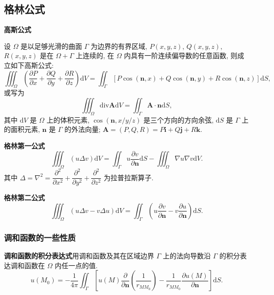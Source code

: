 \subsection{格林公式} \label{4 格林公式}
\textbf{高斯公式}

设 $\Omega$ 是以足够光滑的曲面 $\Gamma$ 为边界的有界区域, $P(x,y,z)$, $Q(x,y,z)$, $R(x,y,z)$ 是在 $\Omega+\Gamma$ 上连续的, 在 $\Omega$ 内具有一阶连续偏导数的任意函数, 则成立如下高斯公式:
\begin{equation}
    \iiint_{\Omega}\left(\frac{\partial P}{\partial x}+\frac{\partial Q}{\partial y}+\frac{\partial R}{\partial z}\right)\mathrm{d}V=\iint_{\Gamma}[P\cos(\boldsymbol{n},x)+Q\cos(\boldsymbol{n},y)+R\cos(\boldsymbol{n},z)]\mathrm{d}S,
\end{equation}
或写为
\begin{equation}
    \iiint_{\Omega}\mathrm{div}\boldsymbol{A}\mathrm{d}V=\iint_{\Gamma}\boldsymbol{A}\cdot\boldsymbol{n}\mathrm{d}S,
\end{equation}
其中 $\mathrm{d}V$ 是 $\Omega$ 上的体积元素, $\cos(\boldsymbol{n}, x/y/z)$ 是三个方向的方向余弦, $\mathrm{d}S$ 是 $\Gamma$ 上的面积元素, $\boldsymbol{n}$ 是 $\Gamma$ 的外法向量; $\boldsymbol{A}=(P,Q,R)=P\boldsymbol{i}+Q\boldsymbol{j}+R\boldsymbol{k}$.

\textbf{格林第一公式}
\begin{equation}
    \iiint_{\Omega}(u\Delta v)\mathrm{d}V=\iint_{\Gamma}u\frac{\partial v}{\partial\boldsymbol{n}}\mathrm{d}S-\iiint_{\Omega}\nabla u\nabla v\mathrm{d}V.
\end{equation}
其中 $\Delta=\nabla^2=\dfrac{\partial^2}{\partial x^2}+\dfrac{\partial^2}{\partial y^2}+\dfrac{\partial^2}{\partial z^2}$ 为拉普拉斯算子.

\textbf{格林第二公式}
\begin{equation} \label{eq:4.2 green 2}
    \iiint_{\Omega}(u\Delta v-v\Delta u)\mathrm{d}V=\iint_{\Gamma}\left(u\frac{\partial v}{\partial\boldsymbol{n}}-v\frac{\partial u}{\partial\boldsymbol{n}}\right)\mathrm{d}S.
\end{equation}

\subsubsection{调和函数的一些性质}
\textbf{调和函数的积分表达式}\quad 用调和函数及其在区域边界 $\Gamma$ 上的法向导数沿 $\Gamma$ 的积分表达调和函数在 $\Omega$ 内任一点的值.
\begin{equation} \label{eq:4.2 u M_0}
    u(M_0)=-\frac{1}{4\pi}\iint_{\Gamma}\left[u(M)\frac{\partial}{\partial\boldsymbol{n}}\left(\frac{1}{r_{MM_0}}\right)-\frac{1}{r_{MM_0}}\frac{\partial u(M)}{\partial\boldsymbol{n}}\right]\mathrm{d}S.
\end{equation}

